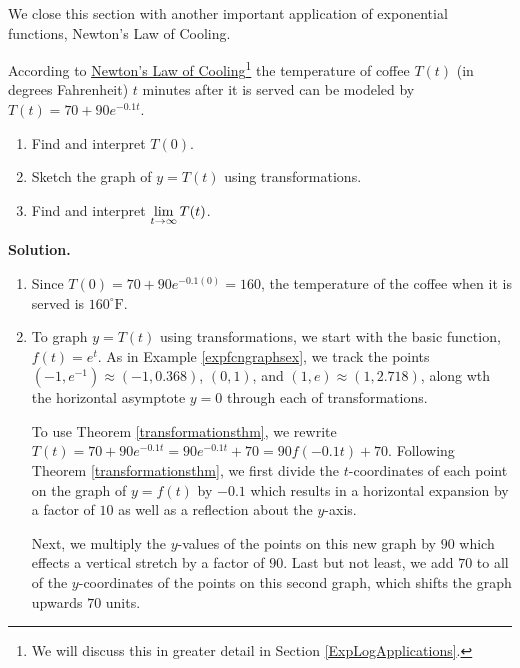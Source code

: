 \documentclass{ximera}
\begin{document}
\smallskip

We close this section with another important application of exponential functions,  Newton's Law of Cooling.

\smallskip

\begin{ex}  \label{exptempex} According to \href{http://en.wikipedia.org/wiki/Heat_transfer#Newton.27s_law_of_cooling}{\underline{Newton's Law of Cooling}}\footnote{We will discuss this in greater detail in Section \ref{ExpLogApplications}.} the temperature of coffee $T(t)$ (in degrees Fahrenheit) $t$ minutes after it is served can be modeled by $T(t) = 70 + 90 e^{-0.1 t}$. 

\begin{enumerate}

\item  Find and interpret $T(0)$.

\item  Sketch the graph of $y = T(t)$ using transformations.

\item  Find and interpret $\ds{\lim_{t \rightarrow \infty} T(t)}$.  

\end{enumerate}

{\bf Solution.}

\begin{enumerate}

\item  Since $T(0) =70 + 90 e^{-0.1 (0)} = 160$,   the temperature of the coffee when it is served is $160^{\circ}\mbox{F}$.

\item  To graph $y = T(t)$ using transformations, we start with the basic function, $f(t)=e^{t}$.  As in Example \ref{expfcngraphsex}, we track the points $(-1, e^{-1}) \approx (-1, 0.368)$, $(0,1)$, and $(1, e) \approx (1, 2.718)$, along wth the horizontal asymptote $y = 0$ through each of transformations.

\smallskip

To use Theorem  \ref{transformationsthm}, we rewrite   $T(t) = 70 + 90e^{-0.1t} = 90e^{-0.1t}+70 = 90 f(-0.1t)+70$.   Following Theorem  \ref{transformationsthm}, we first  divide the $t$-coordinates of each point on the graph of $y=f(t)$ by $-0.1$ which results in a horizontal expansion by a factor of $10$ as well as a reflection about the $y$-axis.  

\smallskip

Next, we multiply the $y$-values of the points on this new graph by $90$ which effects a vertical stretch by a factor of $90$.  Last but not least, we  add $70$ to all of the $y$-coordinates of the points on this second graph, which shifts the graph upwards $70$ units.



\end{enumerate}
\end{ex}
\end{document}
